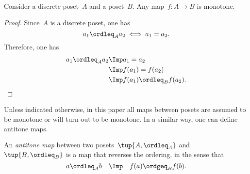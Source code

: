 \begin{lemma}
Consider a discrete poset~$A$ and a poset~$B$. Any map~$f\colon A\to B$ is monotone.
\end{lemma}
\begin{proof}
Since~$A$ is a discrete poset, one has
\begin{equation}
    a_1\ordleq_A a_2 \iff a_1=a_2.
\end{equation}
Therefore, one has
\begin{equation}
\begin{aligned}
    a_1\ordleq_A a_2 &\Imp a_1=a_2\\
    &\Imp f(a_1)=f(a_2)\\
    &\Imp f(a_1)\ordleq_B f(a_2).
\end{aligned}
\end{equation}
\end{proof}
Unless indicated otherwise, in this paper all maps between posets are assumed to be monotone or will turn out to be monotone. In a similar way, one can define antitone maps.
\begin{definition}
An \emph{antitone map} between two posets~$\tup{A, \ordleq_A}$ and~$\tup{B, \ordleq_B}$ is a map that reverses the ordering, in the sense that 
\begin{equation}
 a \ordleq_A b \quad \Imp \quad f(a) \ordgeq_B f(b).
\end{equation}
\end{definition}

